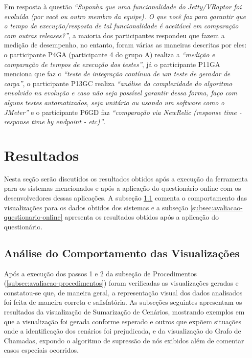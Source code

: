 Em resposta à questão \textit{``Suponha que uma funcionalidade do Jetty/VRaptor foi evoluída (por você ou outro membro da equipe). O que você faz para garantir que o tempo de execução/resposta de tal funcionalidade é aceitável em comparação com outras releases?''}, a maioria dos participantes respondeu que fazem a medição de desempenho, no entanto, foram várias as maneiras descritas por eles: o participante P4GA (participante 4 do grupo A) realiza a \textit{``medição e comparação de tempos de execução dos testes''}, já o participante P11GA menciona que faz o \textit{``teste de integração contínua de um teste de gerador de carga''}, o participante P13GC realiza \textit{``análise da complexidade do algoritmo envolvido na evolução e caso não seja possível garantir dessa forma, faço com alguns testes automatizados, seja unitário ou usando um software como o JMeter''} e o participante P6GD faz \textit{``comparação via NewRelic (response time - response time by endpoint - etc)''}.

\section{Resultados} \label{sec:avaliacao-resultados}

Nesta seção serão discutidos os resultados obtidos após a execução da ferramenta para os sistemas mencionados e após a aplicação do questionário online com os desenvolvedores dessas aplicações. A subseção \ref{subsec:avaliacao-comportamento-visualizacoes} comenta o comportamento das visualizações para os dados obtidos dos sistemas e a subseção \ref{subsec:avaliacao-questionario-online} apresenta os resultados obtidos após a aplicação do questionário.

\subsection{Análise do Comportamento das Visualizações} \label{subsec:avaliacao-comportamento-visualizacoes}

Após a execução dos passos 1 e 2 da subseção de Procedimentos (\ref{subsec:avaliacao-procedimentos}) foram verificadas as visualizações geradas e constatou-se que, de maneira geral, a representação visual dos dados analisados foi feita de maneira correta e safisfatória. As subseções seguintes apresentam os resultados da visualização de Sumarização de Cenários, mostrando exemplos em que a visualização foi gerada conforme esperado e outros que expõem situações onde a identificação dos cenários foi prejudicada, e da visualização do Grafo de Chamadas, expondo o algoritmo de supressão de nós exibidos além de comentar casos especiais ocorridos.

